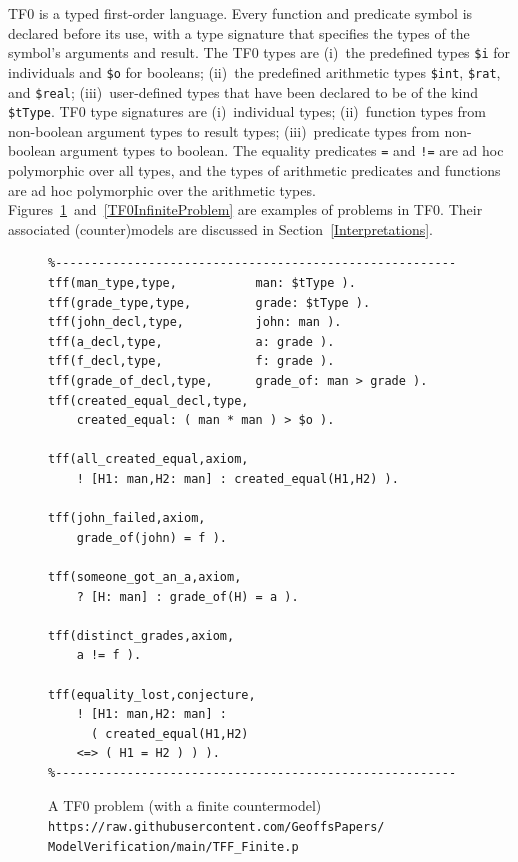 \documentclass[letterpaper]{article}
\newcommand{\smalltt}[1]{\small \texttt{#1}}
\begin{document}
TF0 is a typed first-order language.
Every function and predicate symbol is declared before its use, with a type signature that 
specifies the types of the symbol’s arguments and result.
The TF0 types are
(i)~the predefined types \smalltt{\$i} for individuals and \smalltt{\$o} for booleans; 
(ii)~the predefined arithmetic types \smalltt{\$int}, \smalltt{\$rat}, and \smalltt{\$real}; 
(iii)~user-defined types that have been declared to be of the kind \smalltt{\$tType}.
TF0 type signatures are 
(i)~individual types;
(ii)~function types from non-boolean argument types to result types;
(iii)~predicate types from non-boolean argument types to boolean.
The equality predicates {\tt =} and {\tt !=} are ad hoc polymorphic over all types, and the types 
of arithmetic predicates and functions are ad hoc polymorphic over the arithmetic types.
Figures~\ref{TF0FiniteProblem}~and~\ref{TF0InfiniteProblem} are examples of problems in TF0.  Their associated (counter)models are discussed in Section~\ref{Interpretations}.

\begin{figure}[htbp]
\scriptsize
{}
\begin{verbatim}
%--------------------------------------------------------
tff(man_type,type,           man: $tType ).
tff(grade_type,type,         grade: $tType ).
tff(john_decl,type,          john: man ).
tff(a_decl,type,             a: grade ).
tff(f_decl,type,             f: grade ).
tff(grade_of_decl,type,      grade_of: man > grade ).
tff(created_equal_decl,type, 
    created_equal: ( man * man ) > $o ).

tff(all_created_equal,axiom,
    ! [H1: man,H2: man] : created_equal(H1,H2) ).

tff(john_failed,axiom,
    grade_of(john) = f ).

tff(someone_got_an_a,axiom,
    ? [H: man] : grade_of(H) = a ).

tff(distinct_grades,axiom,
    a != f ).

tff(equality_lost,conjecture,
    ! [H1: man,H2: man] :
      ( created_equal(H1,H2)
    <=> ( H1 = H2 ) ) ).
%--------------------------------------------------------
\end{verbatim}
\caption{A TF0 problem (with a finite countermodel)\\
{\scriptsize {\tt https://raw.githubusercontent.com/GeoffsPapers/\\
ModelVerification/main/TFF\_Finite.p}}}
\label{TF0FiniteProblem}
\end{figure}
\end{document}
